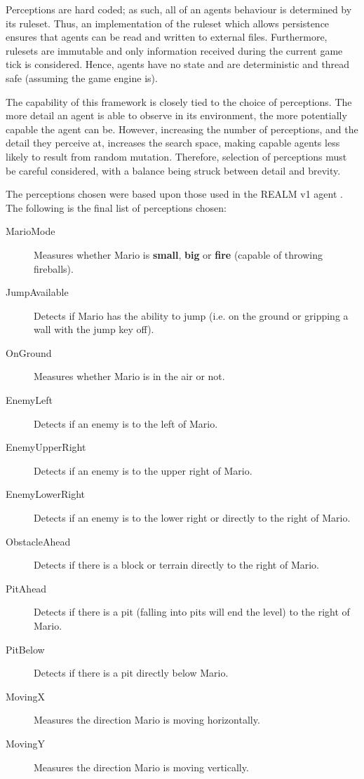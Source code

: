 \vspace{\baselineskip}

Perceptions are hard coded; as such, all of an agents behaviour is determined by its ruleset. Thus, an implementation of the ruleset which allows persistence ensures that agents can be read and written to external files. Furthermore, rulesets are immutable and only information received during the current game tick is considered. Hence, agents have no state and are deterministic and thread safe (assuming the game engine is).

The capability of this framework is closely tied to the choice of perceptions. The more detail an agent is able to observe in its environment, the more potentially capable the agent can be. However, increasing the number of perceptions, and the detail they perceive at, increases the search space, making capable agents less likely to result from random mutation. Therefore, selection of perceptions must be careful considered, with a balance being struck between detail and brevity. 

The perceptions chosen were based upon those used in the REALM v1 agent \cite[p.~85]{realm}. The following is the final list of perceptions chosen:
\begin{description}
\item[MarioMode] Measures whether Mario is \textbf{small}, \textbf{big} or \textbf{fire} (capable of throwing fireballs).
\item[JumpAvailable] Detects if Mario has the ability to jump (i.e. on the ground or gripping a wall with the jump key off).
\item[OnGround] Measures whether Mario is in the air or not.
\item[EnemyLeft] Detects if an enemy is to the left of Mario.
\item[EnemyUpperRight] Detects if an enemy is to the upper right of Mario.
\item[EnemyLowerRight] Detects if an enemy is to the lower right or directly to the right of Mario.
\item[ObstacleAhead] Detects if there is a block or terrain directly to the right of Mario.
\item[PitAhead] Detects if there is a pit (falling into pits will end the level) to the right of Mario.
\item[PitBelow] Detects if there is a pit directly below Mario.
\item[MovingX] Measures the direction Mario is moving horizontally.
\item[MovingY] Measures the direction Mario is moving vertically.
\end{description}

